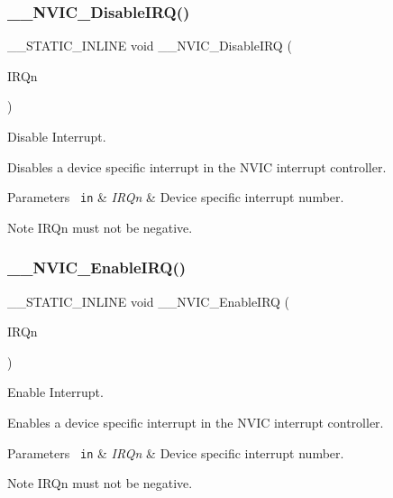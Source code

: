 \subsubsection{\texorpdfstring{\_\_NVIC\_DisableIRQ()}{\_\_NVIC\_DisableIRQ()}}
{\footnotesize\ttfamily \+\_\+\+\_\+\+S\+T\+A\+T\+I\+C\+\_\+\+I\+N\+L\+I\+NE void \+\_\+\+\_\+\+N\+V\+I\+C\+\_\+\+Disable\+I\+RQ (\begin{DoxyParamCaption}\item[{\mbox{\hyperlink{group___configuration__section__for___c_m_s_i_s_ga7e1129cd8a196f4284d41db3e82ad5c8}{I\+R\+Qn\+\_\+\+Type}}}]{I\+R\+Qn }\end{DoxyParamCaption})}



Disable Interrupt. 

Disables a device specific interrupt in the N\+V\+IC interrupt controller. 
\begin{DoxyParams}[1]{Parameters}
\mbox{\texttt{ in}}  & {\em I\+R\+Qn} & Device specific interrupt number. \\
\hline
\end{DoxyParams}
\begin{DoxyNote}{Note}
I\+R\+Qn must not be negative. 
\end{DoxyNote}
\mbox{\label{group___c_m_s_i_s___core___n_v_i_c_functions_ga71227e1376cde11eda03fcb62f1b33ea}} 
\subsubsection{\texorpdfstring{\_\_NVIC\_EnableIRQ()}{\_\_NVIC\_EnableIRQ()}}
{\footnotesize\ttfamily \+\_\+\+\_\+\+S\+T\+A\+T\+I\+C\+\_\+\+I\+N\+L\+I\+NE void \+\_\+\+\_\+\+N\+V\+I\+C\+\_\+\+Enable\+I\+RQ (\begin{DoxyParamCaption}\item[{\mbox{\hyperlink{group___configuration__section__for___c_m_s_i_s_ga7e1129cd8a196f4284d41db3e82ad5c8}{I\+R\+Qn\+\_\+\+Type}}}]{I\+R\+Qn }\end{DoxyParamCaption})}



Enable Interrupt. 

Enables a device specific interrupt in the N\+V\+IC interrupt controller. 
\begin{DoxyParams}[1]{Parameters}
\mbox{\texttt{ in}}  & {\em I\+R\+Qn} & Device specific interrupt number. \\
\hline
\end{DoxyParams}
\begin{DoxyNote}{Note}
I\+R\+Qn must not be negative. 
\end{DoxyNote}
\mbox{\label{group___c_m_s_i_s___core___n_v_i_c_functions_gaa2837003c28c45abf193fe5e8d27f593}} 
